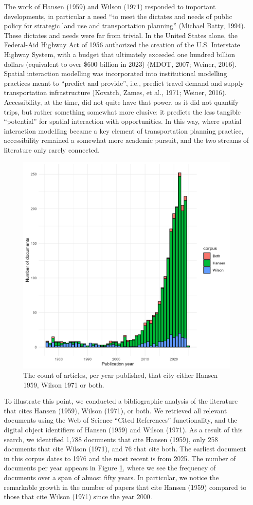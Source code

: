 \documentclass[
11pt, %
oneside, %
english, %
singlespacing, %
]{macthesis} %
\begin{document}
The work of Hansen (1959) and Wilson (1971) responded to important developments, in particular a need ``to meet the dictates and needs of public policy for strategic land use and transportation planning'' (Michael Batty, 1994). These dictates and needs were far from trivial. In the United States alone, the Federal-Aid Highway Act of 1956 authorized the creation of the U.S. Interstate Highway System, with a budget that ultimately exceeded one hundred billion dollars (equivalent to over \$600 billion in 2023) (MDOT, 2007; Weiner, 2016). Spatial interaction modelling was incorporated into institutional modelling practices meant to ``predict and provide'', i.e., predict travel demand and supply transportation infrastructure (Kovatch, Zames, et al., 1971; Weiner, 2016). Accessibility, at the time, did not quite have that power, as it did not quantify trips, but rather something somewhat more elusive: it predicts the less tangible ``potential'' for spatial interaction with opportunities. In this way, where spatial interaction modelling became a key element of transportation planning practice, accessibility remained a somewhat more academic pursuit, and the two streams of literature only rarely connected.

\begin{figure}
\includegraphics[width=0.7\linewidth]{data/figures/chp1-docs_per_year_plot} \caption{The count of articles, per year published, that city either Hansen 1959, Wilson 1971 or both.}\label{fig:chp1-fig-docs-per-year}
\end{figure}

To illustrate this point, we conducted a bibliographic analysis of the literature that cites Hansen (1959), Wilson (1971), or both. We retrieved all relevant documents using the Web of Science ``Cited References'' functionality, and the digital object identifiers of Hansen (1959) and Wilson (1971). As a result of this search, we identified 1,788 documents that cite Hansen (1959), only 258 documents that cite Wilson (1971), and 76 that cite both. The earliest document in this corpus dates to 1976 and the most recent is from 2025. The number of documents per year appears in Figure \ref{fig:chp1-fig-docs-per-year}, where we see the frequency of documents over a span of almost fifty years. In particular, we notice the remarkable growth in the number of papers that cite Hansen (1959) compared to those that cite Wilson (1971) since the year 2000.
\end{document}
